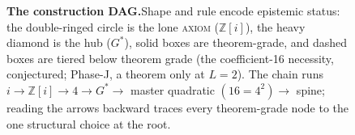 \begin{figure}[t!]
{}
  \caption[The construction DAG]{\textbf{The construction DAG.}\enspace Shape
    and rule encode epistemic status: the double-ringed circle is the lone
    \textsc{axiom} ($\mathbb{Z}[i]$), the heavy diamond is the hub ($G^{*}$),
    solid boxes are theorem-grade, and dashed boxes are tiered below theorem
    grade (the coefficient-16 necessity, conjectured; Phase-J, a theorem only at
    $L=2$). The chain runs $i \to \mathbb{Z}[i] \to 4 \to G^{*} \to{}$ master
    quadratic $(16=4^{2}) \to{}$ spine; reading the arrows backward traces every
    theorem-grade node to the one structural choice at the root.}
  \label{fig:dag}
\end{figure}
